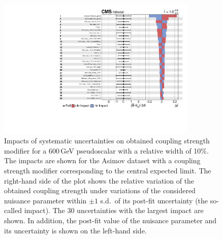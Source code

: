 \begin{figure}[!Hhtb]
\centering
\includegraphics[width=0.85\textwidth,keepaspectratio=true]{fig/app5/impacts/impacts_600.pdf}
\caption{Impacts of systematic uncertainties on obtained coupling strength modifier for a 600\,GeV pseudoscalar with a relative width of 10\%. The impacts are shown for the Asimov dataset with a coupling strength modifier corresponding to the central expected limit. The right-hand side of the plot shows the relative variation of the obtained coupling strength under variations of the considered nuisance parameter within $\pm 1$ s.d.\ of its post-fit uncertainty (the so-called impact). The 30 uncertainties with the largest impact are shown. In addition, the post-fit value of the nuisance parameter and its uncertainty is shown on the left-hand side.}
\label{fig:iimpacts_m600}
\end{figure}

